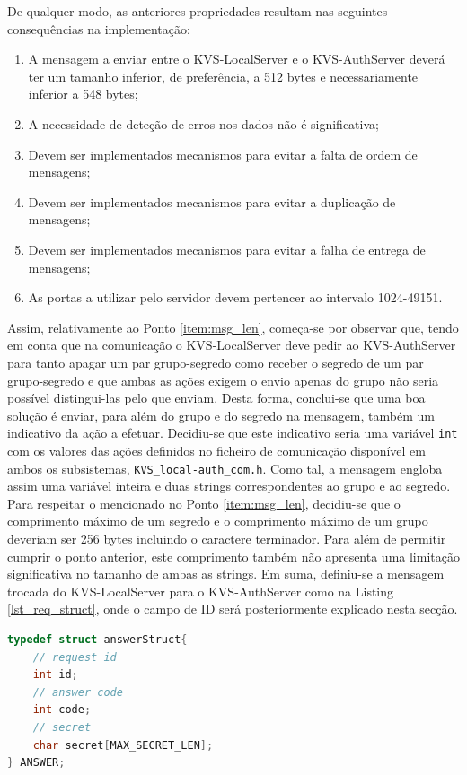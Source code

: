 De qualquer modo, as anteriores propriedades resultam nas seguintes consequências na implementação:
\begin{enumerate}[noitemsep]
    \item A mensagem a enviar entre o KVS-LocalServer e o KVS-AuthServer deverá ter um tamanho inferior, de preferência, a 512 bytes e necessariamente inferior a 548 bytes; \label{item:msg_len}
    \item A necessidade de deteção de erros nos dados não é significativa;
    \item Devem ser implementados mecanismos para evitar a falta de ordem de mensagens; \label{item:msg_disorder}
    \item Devem ser implementados mecanismos para evitar a duplicação de mensagens; \label{item:msg_duplicacao}
    \item Devem ser implementados mecanismos para evitar a falha de entrega de mensagens; \label{item:msg_falha}
    \item As portas a utilizar pelo servidor devem pertencer ao intervalo 1024-49151.
\end{enumerate}

Assim, relativamente ao Ponto \ref{item:msg_len}, começa-se por observar que, tendo em conta que na comunicação o KVS-LocalServer deve pedir ao KVS-AuthServer para tanto apagar um par grupo-segredo como receber o segredo de um par grupo-segredo e que ambas as ações exigem o envio apenas do grupo não seria possível distingui-las pelo que enviam. Desta forma, conclui-se que uma boa solução é enviar, para além do grupo e do segredo na mensagem, também um indicativo da ação a efetuar. Decidiu-se que este indicativo seria uma variável \texttt{int} com os valores das ações definidos no ficheiro de comunicação disponível em ambos os subsistemas, \texttt{KVS\_local-auth\_com.h}. Como tal, a mensagem engloba assim uma variável inteira e duas strings correspondentes ao grupo e ao segredo. Para respeitar o mencionado no Ponto \ref{item:msg_len}, decidiu-se que o comprimento máximo de um segredo e o comprimento máximo de um grupo deveriam ser 256 bytes incluindo o caractere terminador. Para além de permitir cumprir o ponto anterior, este comprimento também não apresenta uma limitação significativa no tamanho de ambas as strings. Em suma, definiu-se a mensagem trocada do KVS-LocalServer para o KVS-AuthServer como na Listing \ref{lst_req_struct}, onde o campo de ID será posteriormente explicado nesta secção.
\begin{lstlisting}[language=C,label={lst_req_struct},caption=Estrutura \texttt{REQ} para a comunicação do KVS-LocalServer para o KVS-AuthServer.]
typedef struct answerStruct{
    // request id
    int id;
    // answer code
    int code;
    // secret
    char secret[MAX_SECRET_LEN];
} ANSWER;
\end{lstlisting}

